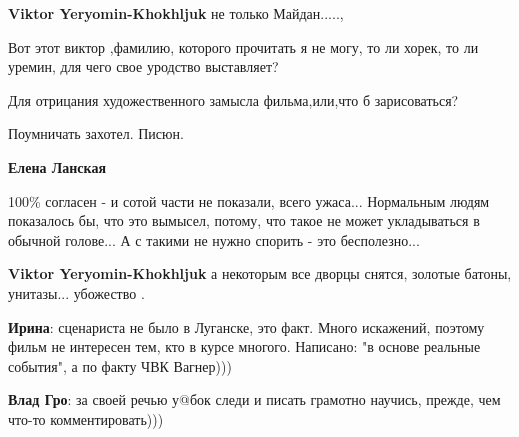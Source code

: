 \begin{itemize}
\begin{itemize}
\textbf{Viktor Yeryomin-Khokhljuk} не только Майдан.....,


Вот этот виктор ,фамилию, которого прочитать я не могу, то ли хорек, то ли
уремин, для чего свое уродство выставляет?

Для отрицания художественного замысла фильма,или,что б зарисоваться?

Поумничать захотел. Писюн.

 
\textbf{Елена Ланская} 

100\% согласен - и сотой части не показали, всего ужаса... Нормальным людям
показалось бы, что это вымысел, потому, что такое не может укладываться в
обычной голове... А с такими не нужно спорить - это бесполезно...


\textbf{Viktor Yeryomin-Khokhljuk} а некоторым все дворцы снятся, золотые батоны, унитазы... убожество .

 

\textbf{Ирина}: сценариста не было в Луганске, это факт. Много искажений, поэтому фильм
не интересен тем, кто в курсе многого. Написано: "в основе реальные события", а
по факту ЧВК Вагнер)))


 
\textbf{Влад Гро}: за своей речью у@бок следи и писать грамотно научись, прежде, чем что-то комментировать)))

 

\end{itemize}
\end{itemize}
